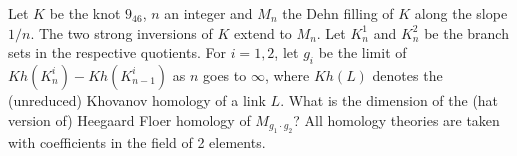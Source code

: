 Let $K$ be the knot $9_{46}$, $n$ an integer and $M_n$ the Dehn filling of $K$ along the slope $1/n$. The two strong inversions of $K$ extend to $M_n$. Let $K^1_n$ and $K^2_n$ be the branch sets in the respective quotients. For $i=1,2$, let $g_i$ be the limit of $Kh(K^i_n)-Kh(K^i_{n-1})$ as $n$ goes to $\infty$, where $Kh(L)$ denotes the (unreduced) Khovanov homology of a link $L$.  What is the dimension of the (hat version of) Heegaard Floer homology of $M_{g_1\cdot g_2}$? All homology theories are taken with coefficients in the field of 2 elements.

